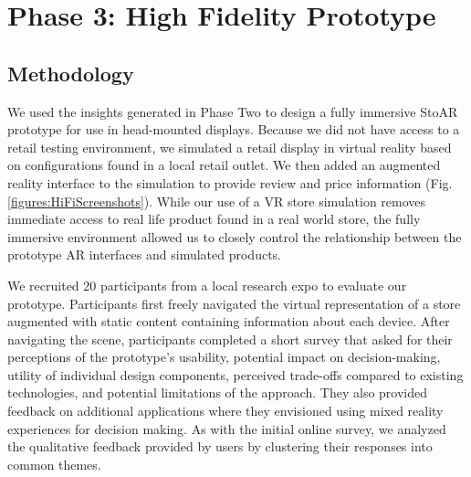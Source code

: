 \section{Phase 3: High Fidelity Prototype}

\subsection{Methodology}
We used the 
insights generated
in Phase Two to design a fully immersive StoAR prototype for use in head-mounted displays. Because we did not have access to a retail testing environment, we simulated a retail display in virtual reality based on configurations found in a local retail outlet. We then added an augmented reality interface to the simulation to provide review and price information (Fig. \ref{figures:HiFiScreenshots}). While our use of a VR store simulation removes immediate access to real life product found in a real world store, the fully immersive environment allowed us to closely control the relationship between the prototype AR interfaces and simulated products. %


We recruited 20 participants from a local research expo to evaluate our prototype. Participants first freely navigated the virtual representation of a store augmented with static content containing information about each device.
After navigating the scene, participants completed a short survey that asked for their perceptions of the prototype's usability, potential impact on decision-making, utility of individual design components, perceived trade-offs compared to existing technologies, and potential limitations of the approach. They also provided feedback on additional applications where they envisioned using mixed reality experiences for decision making. As with the initial online survey, we analyzed the qualitative feedback provided by users by clustering their responses into common themes.


